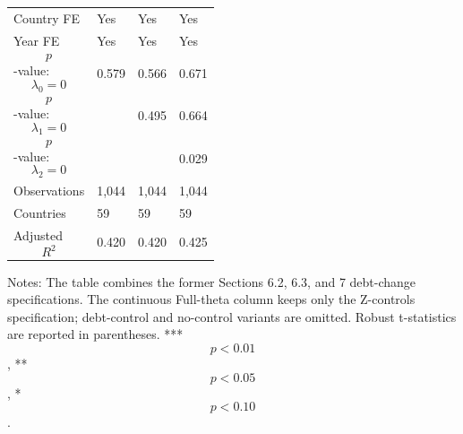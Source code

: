 \begin{table}[H]
\begin{threeparttable}
\begin{tabularx}{\textwidth}{lYYY}
Country FE & Yes & Yes & Yes \\
Year FE & Yes & Yes & Yes \\
$$p$$-value: $$\lambda_0=0$$ & 0.579 & 0.566 & 0.671 \\
$$p$$-value: $$\lambda_1=0$$ &  & 0.495 & 0.664 \\
$$p$$-value: $$\lambda_2=0$$ &  &  & 0.029 \\
Observations & 1,044 & 1,044 & 1,044 \\
Countries & 59 & 59 & 59 \\
Adjusted $$R^2$$ & 0.420 & 0.420 & 0.425 \\
\bottomrule
\end{tabularx}
\begin{tablenotes}[flushleft]\footnotesize
\item Notes: The table combines the former Sections 6.2, 6.3, and 7 debt-change specifications. The continuous Full-theta column keeps only the Z-controls specification; debt-control and no-control variants are omitted. Robust t-statistics are reported in parentheses. *** $$p<0.01$$, ** $$p<0.05$$, * $$p<0.10$$.
\end{tablenotes}
\end{threeparttable}
\end{table}
